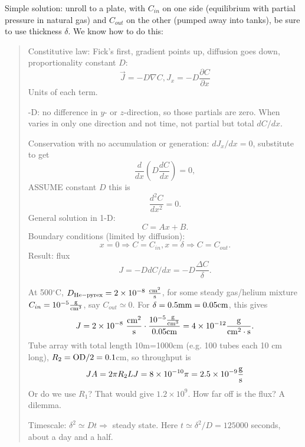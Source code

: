 \documentclass{report}
\begin{document}
Simple solution: unroll to a plate, with $C_{in}$ on one side (equilibrium with
partial pressure in natural gas) and $C_{out}$ on the other (pumped away into
tanks), be sure to use thickness $\delta$.  We know how to do this:
\begin{quotation}
  \noindent Constitutive law: Fick's first, gradient points up, diffusion goes
  down, proportionality constant $D$:
  \begin{equation}
    \label{eq:ficksfirst}
    \vec{J} = -D\nabla C, J_x = -D \frac{\partial C}{\partial x}
  \end{equation}
  Units of each term.

  -D: no difference in $y$- or $z$-direction, so those partials are
  zero.  When varies in only one direction and not time, not partial but total
  $dC/dx$.

  \noindent Conservation with no accumulation or generation: $dJ_x/dx = 0$,
  substitute to get
  \begin{equation}
    \label{eq:ficks1.5}
    \frac{d}{dx}\left(D\frac{dC}{dx}\right) = 0,
  \end{equation}
  ASSUME constant $D$ this is
  \begin{equation}
    \label{eq:ficksecond}
    \frac{d^2 C}{dx^2} = 0.
  \end{equation}
  General solution in 1-D:
  \begin{equation}
    \label{eq:linear}
    C = Ax + B.
  \end{equation}
  Boundary conditions (limited by diffusion):
  \begin{equation}
    \label{eq:linbcs}
    x=0 \Rightarrow C=C_{in}, x=\delta \Rightarrow C=C_{out}.
  \end{equation}
  Result: flux
  \begin{equation}
    \label{eq:linflux}
    J=-D dC/dx=-D \frac{\Delta C}{\delta}.
  \end{equation}

  At 500$^\circ$C, $D_{\rm He-pyrex}=2\times 10^{-8}\ \frac{\rm cm^2}{\rm s}$,
  for some steady gas/helium mixture $C_{in}=10^{-5}\frac{\rm g}{\rm cm^3}$,
  say $C_{out}\simeq 0$.  For $\delta={\rm 0.5mm=0.05cm}$, this gives
  \begin{equation}
    \label{eq:realflux}
    J = {\rm 2\times 10^{-8}\ \frac{cm^2}{s} \cdot
    \frac{10^{-5}\frac{g}{cm^3}}{0.05cm} =
    4\times10^{-12}\frac{g}{cm^2\cdot s}}.
  \end{equation}
  Tube array with total length 10m=1000cm (e.g. 100 tubes each 10 cm long),
  $R_2={\rm OD}/2=0.1$cm, so throughput is
  \begin{equation}
    \label{eq:realfluxarea}
    JA = 2\pi R_2 L J = 8\times10^{-10}\pi =
  2.5\times10^{-9}\frac{\rm g}{\rm s}
  \end{equation}
  Or do we use $R_1$?  That would give $1.2\times10^9$.  How far off is the
  flux?  A dilemma.

  \noindent Timescale: $\delta^2 \simeq Dt \Rightarrow$ steady state.  Here
  $t\simeq\delta^2/D=125000$ seconds, about a day and a half.
\end{quotation}
\end{document}
